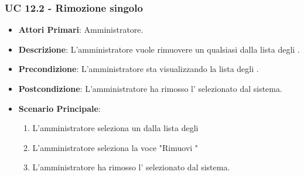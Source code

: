 		\subsubsection{UC 12.2 - Rimozione singolo }
		\begin{itemize}
			\item \textbf{Attori Primari}: Amministratore.
			\item \textbf{Descrizione}: L'amministratore vuole rimuovere un qualsiasi  dalla lista degli .
			\item \textbf{Precondizione}: L'amministratore sta visualizzando la lista degli .
			\item \textbf{Postcondizione}: L'amministratore ha rimosso l' selezionato dal sistema.
			\item \textbf{Scenario Principale}:
			\begin{enumerate}
				\item{L'amministratore seleziona un  dalla lista degli }
				\item{L'amministratore seleziona la voce "Rimuovi "}
				\item{L'amministratore ha rimosso l' selezionato dal sistema.}
			\end{enumerate}	
		\end{itemize}
